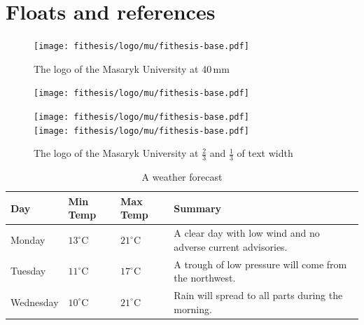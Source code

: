 \documentclass[
  digital, %
  table,   %
  lof,     %
  lot,     %
]{fithesis3}
\begin{document}
\chapter{Floats and references}
\begin{figure}
  \begin{center}
    \texttt{[image: fithesis/logo/mu/fithesis-base.pdf]}
  \end{center}
  \caption{The logo of the Masaryk University at 40\,mm}
  \label{fig:mulogo1}
\end{figure}

\begin{figure}
  \begin{minipage}{.66\textwidth}
    \texttt{[image: fithesis/logo/mu/fithesis-base.pdf]}
  \end{minipage}
  \begin{minipage}{.33\textwidth}
    \texttt{[image: fithesis/logo/mu/fithesis-base.pdf]} \\
    \texttt{[image: fithesis/logo/mu/fithesis-base.pdf]}
  \end{minipage}
  \caption{The logo of the Masaryk University at $\frac23$ and
    $\frac13$ of text width}
  \label{fig:mulogo2}
\end{figure}

\begin{table}
  \begin{tabularx}{\textwidth}{lllX}
    \toprule
    Day & Min Temp & Max Temp & Summary \\
    \midrule
    Monday & $13^{\circ}\mathrm{C}$ & $21^\circ\mathrm{C}$ & A
    clear day with low wind and no adverse current advisories. \\
    Tuesday & $11^{\circ}\mathrm{C}$ & $17^\circ\mathrm{C}$ & A
    trough of low pressure will come from the northwest. \\
    Wednesday & $10^{\circ}\mathrm{C}$ &
    $21^\circ\mathrm{C}$ & Rain will spread to all parts during the
    morning. \\
    \bottomrule
  \end{tabularx}
  \caption{A weather forecast}
  \label{tab:weather}
\end{table}
\end{document}
